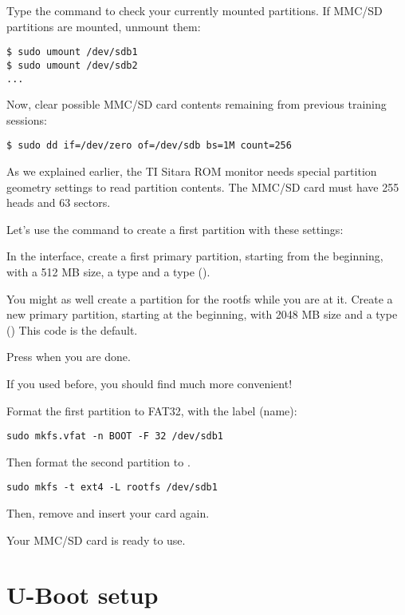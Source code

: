 Type the  command to check your currently mounted
partitions. If MMC/SD partitions are mounted, unmount them:

\begin{verbatim}
$ sudo umount /dev/sdb1
$ sudo umount /dev/sdb2
...
\end{verbatim}

Now, clear possible MMC/SD card contents remaining from previous training 
sessions:

\begin{verbatim}
$ sudo dd if=/dev/zero of=/dev/sdb bs=1M count=256
\end{verbatim}

As we explained earlier, the TI Sitara ROM monitor needs special partition geometry settings
to read partition contents. The MMC/SD card must have 255 heads and 63 sectors.

Let's use the  command to create a first partition with these settings:


In the  interface, create a first primary partition, starting from the beginning,
with a 512 MB size, a  type and a  type ().

You might as well create a partition for the rootfs while you are at it.
Create a new primary partition, starting at the beginning, with 2048 MB size and a  
type ()  This code is the default.

Press  when you are done.

If you used  before, you should find  much more convenient!

Format the first partition to FAT32, with the  label (name):

\begin{verbatim}
sudo mkfs.vfat -n BOOT -F 32 /dev/sdb1
\end{verbatim}

Then format the second partition to .

\begin{verbatim}
sudo mkfs -t ext4 -L rootfs /dev/sdb1
\end{verbatim}

Then, remove and insert your card again.

Your MMC/SD card is ready to use.

\section{U-Boot setup}

